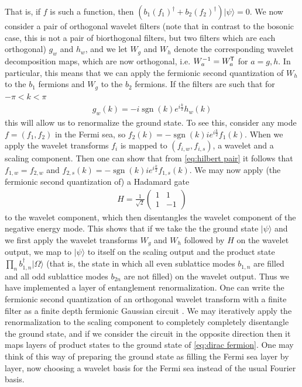 \documentclass[submission, Phys]{SciPost}
\theoremstyle{definition}
\theoremstyle{remark}
\DeclareMathOperator{\sgn}{sgn}
\newcommand{\ket}[1]{\lvert#1\rangle}
\newcommand*{\tran}{{\mkern-1.5mu\mathsf{T}}}
\begin{document}
\begin{appendix}
{That is, if $f$ is such a function, then $(b_1(f_1)^\dagger + b_2(f_2)^\dagger) \ket{\psi} = 0$.
We now consider a pair of orthogonal wavelet filters (note that in contrast to the bosonic case, this is not a pair of biorthogonal filters, but two filters which are each orthogonal) $g_w$ and $h_w$, and we let $W_g$ and $W_h$ denote the corresponding wavelet decomposition maps, which are now orthogonal, i.e. $W_a^{-1} = W_a^{\tran}$ for $a = g,h$.
In particular, this means that we can apply the fermionic second quantization of $W_h$ to the $b_1$ fermions and $W_g$ to the $b_2$ fermions.
If the filters are such that for $-\pi < k < \pi$
\begin{align}\label{eq:hilbert pair}
  g_w(k) = -i\sgn(k)e^{i\frac{k}{2}}h_w(k)
\end{align}
this will allow us to renormalize the ground state.
To see this, consider any mode $f = (f_1, f_2)$ in the Fermi sea, so $f_2(k) = -\sgn(k)ie^{i\frac{k}{2}}f_1(k)$.
When we apply the wavelet transforms $f_i$ is mapped to $(f_{i,w}, f_{i,s})$, a wavelet and a scaling component.
Then one can show that from \cref{eq:hilbert pair} it follows that $f_{1,w} = f_{2,w}$ and $f_{2,s}(k) = -\sgn(k)ie^{i\frac{k}{2}}f_{1,s}(k)$.
We may now apply (the fermionic second quantization of) a Hadamard gate
\begin{align*}
  H = \frac{1}{\sqrt2}\begin{pmatrix} 1 & 1 \\ 1 & -1 \end{pmatrix}
\end{align*}
to the wavelet component, which then disentangles the wavelet component of the negative energy mode.
This shows that if we take the the ground state $\ket{\psi}$ and we first apply the wavelet transforms $W_g$ and $W_h$ followed by $H$ on the wavelet output, we map to $\ket{\psi}$ to itself on the scaling output and the product state $\prod_n b_{1,n}^\dagger \ket{\Omega}$ (that is, the state in which all even sublattice modes $b_{1,n}$ are filled and all odd sublattice modes $b_{2n}$ are not filled) on the wavelet output.
Thus we have implemented a layer of entanglement renormalization.
One can write the fermionic second quantization of an orthogonal wavelet transform with a finite filter as a finite depth fermionic Gaussian circuit \cite{evenbly2018representation}.
We may iteratively apply the renormalization to the scaling component to completely completely disentangle the ground state, and if we consider the circuit in the opposite direction then it maps layers of product states to the ground state of \cref{eq:dirac fermion}.
One may think of this way of preparing the ground state as filling the Fermi sea layer by layer, now choosing a wavelet basis for the Fermi sea instead of the usual Fourier basis.

}
\end{appendix}
\end{document}
